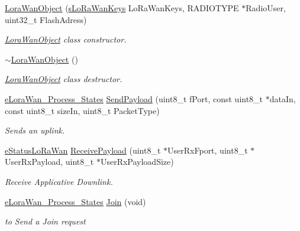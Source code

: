 \begin{DoxyCompactItemize}
\item 
\mbox{\hyperlink{class_lora_wan_object_a87c736c95588e388ae5c2475220827c4}{Lora\+Wan\+Object}} (\mbox{\hyperlink{structs_lo_ra_wan_keys}{s\+Lo\+Ra\+Wan\+Keys}} Lo\+Ra\+Wan\+Keys, R\+A\+D\+I\+O\+T\+Y\+PE $\ast$Radio\+User, uint32\+\_\+t Flash\+Adress)
\begin{DoxyCompactList}\small\item\em \mbox{\hyperlink{class_lora_wan_object}{Lora\+Wan\+Object}} class constructor. \end{DoxyCompactList}\item 
\mbox{\hyperlink{class_lora_wan_object_a9607905d493f2dee3273264b801aae6d}{$\sim$\+Lora\+Wan\+Object}} ()
\begin{DoxyCompactList}\small\item\em \mbox{\hyperlink{class_lora_wan_object}{Lora\+Wan\+Object}} class destructor. \end{DoxyCompactList}\item 
\mbox{\hyperlink{_define_8h_acabcd539e4bcc6575c90bd7d857b21f4}{e\+Lora\+Wan\+\_\+\+Process\+\_\+\+States}} \mbox{\hyperlink{class_lora_wan_object_af5ed07270b8db6c03b6afeb9265fd2c1}{Send\+Payload}} (uint8\+\_\+t f\+Port, const uint8\+\_\+t $\ast$data\+In, const uint8\+\_\+t size\+In, uint8\+\_\+t Packet\+Type)
\begin{DoxyCompactList}\small\item\em Sends an uplink. \end{DoxyCompactList}\item 
\mbox{\hyperlink{_define_8h_a1cea710adbbf5b02bced8f79cd82f7b9}{e\+Status\+Lo\+Ra\+Wan}} \mbox{\hyperlink{class_lora_wan_object_ad78f345b6a38581433b4193df9c7d5f7}{Receive\+Payload}} (uint8\+\_\+t $\ast$User\+Rx\+Fport, uint8\+\_\+t $\ast$User\+Rx\+Payload, uint8\+\_\+t $\ast$User\+Rx\+Payload\+Size)
\begin{DoxyCompactList}\small\item\em Receive Applicative Downlink. \end{DoxyCompactList}\item 
\mbox{\hyperlink{_define_8h_acabcd539e4bcc6575c90bd7d857b21f4}{e\+Lora\+Wan\+\_\+\+Process\+\_\+\+States}} \mbox{\hyperlink{class_lora_wan_object_a4585cc16886b0dc622ce768184d2d5e0}{Join}} (void)
\begin{DoxyCompactList}\small\item\em to Send a Join request \end{DoxyCompactList}\item 

\end{DoxyCompactItemize}
